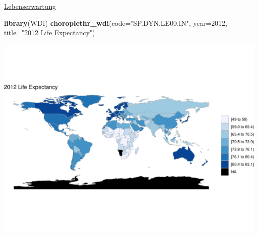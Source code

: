 \documentclass[ignorenonframetext,]{beamer}
\newenvironment{Shaded}{\begin{snugshade}}{\end{snugshade}}
\newcommand{\DataTypeTok}[1]{\textcolor[rgb]{0.13,0.29,0.53}{#1}}
\newcommand{\DecValTok}[1]{\textcolor[rgb]{0.00,0.00,0.81}{#1}}
\newcommand{\KeywordTok}[1]{\textcolor[rgb]{0.13,0.29,0.53}{\textbf{#1}}}
\newcommand{\NormalTok}[1]{#1}
\newcommand{\StringTok}[1]{\textcolor[rgb]{0.31,0.60,0.02}{#1}}
\begin{document}
\begin{frame}[fragile]{\href{http://mirrors.softliste.de/cran/web/packages/choroplethr/vignettes/f-world-bank-data.html}{Lebenserwartung}}
\protect\hypertarget{lebenserwartung}{}

\begin{Shaded}
\begin{Highlighting}[]
\KeywordTok{library}\NormalTok{(WDI) }
\KeywordTok{choroplethr_wdi}\NormalTok{(}\DataTypeTok{code=}\StringTok{"SP.DYN.LE00.IN"}\NormalTok{, }\DataTypeTok{year=}\DecValTok{2012}\NormalTok{,}
                \DataTypeTok{title=}\StringTok{"2012 Life Expectancy"}\NormalTok{)}
\end{Highlighting}
\end{Shaded}

\includegraphics{Choroplethen_files/figure-beamer/unnamed-chunk-26-1.pdf}

\end{frame}
\end{document}
